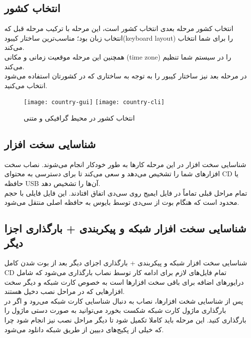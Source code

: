 \subsection{انتخاب کشور}
\begin{frame}{انتخاب کشور}
  مرحله بعدی انتخاب کشور است، این مرحله با ترکیب مرحله قبل که انتخاب زبان بود؛ مناسب‌ترین ساختار کیبود(keyboard layout) را برای شما انتخاب می‌کند.\\
  همچنین این مرحله موقعیت زمانی و مکانی (time zone) را در سیستم شما تنظیم می‌کند.\\
  در مرحله بعد نیز ساختار کیبور را به توجه به ساختاری که در کشورتان استفاده می‌شود انتخاب می‌کنید.
  \begin{figure}
    \texttt{[image: country-gui]}
    \texttt{[image: country-cli]}
    \caption{انتخاب کشور در محیط گرافیکی و متنی~\cite{fig:deb_country_gui}}
  \end{figure}
\end{frame}
\subsection{شناسایی سخت افزار}
\begin{frame}{شناسایی سخت افزار}
  در این مرحله کارها به طور خودکار انجام می‌شوند. نصاب سخت افزارهای شما را تشخیص می‌دهد و سعی می‌کند تا برای دسترسی به محتوای CD یا حافظه USB آن‌ها را تشخیص دهد.\\
تمام مراحل قبلی تماماً در فایل ایمیج روی سی‌دی اتفاق افتادند. این فایل فایلی با حجم محدود است که هنگام بوت از سی‌دی توسط بایوس به حافظه اصلی منتقل می‌شود.
\end{frame}
\subsection{شناسایی سخت افزار شبکه و پیکربندی + بارگذاری اجزا دیگر}
\begin{frame}{شناسایی سخت افزار شبکه و پیکربندی + بارگذاری اجزای دیگر}
  بعد از بوت شدن کامل CD تمام فایل‌های لازم برای ادامه کار توسط نصاب بارگذاری می‌شود که شامل درایورهای اضافه برای باقی سخت افزارها است به خصوص کارت شبکه و دیگر سخت افزارهایی که در مراحل نصب دخیل هستند.\\
  پس از شناسایی شخت افزارها، نصاب به دنبال شناسایی کارت شبکه می‌رود و اگر در بارگذاری ماژول کارت شبکه شکست بخورد می‌توانید به صورت دستی ماژول را بارگذاری کنید.
  این مرحله باید کاملا تکمیل شود تا دیگر مراحل نصب نیز انجام شود چرا که خیلی از پکیج‌های دبیین از طریق شبکه دانلود می‌شود.
\end{frame}
